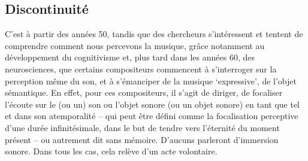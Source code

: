 \documentclass{article}
\begin{document}



\subsection{Discontinuité}


C'est à partir des années 50, tandis que des chercheurs s'intéressent et tentent de comprendre comment nous percevons la musique, grâce notamment au développement du cognitivisme et, plus tard dans les années 60, des neurosciences, que certains compositeurs commencent à s'interroger sur la perception même du son, et à s'émanciper de la musique `expressive', de l'objet sémantique. En effet, pour ces compositeurs, il s'agit de diriger, de focaliser l'écoute sur le (ou un) son ou l'objet sonore (ou un objet sonore) en tant que tel et dans son atemporalité -- qui peut être défini comme la focalisation perceptive d'une durée infinitésimale, dans le but de tendre vers l'éternité du moment présent -- ou autrement dit sans mémoire. D'aucuns parleront d'immersion sonore. Dans tous les cas, cela relève d'un acte volontaire.
\end{document}
